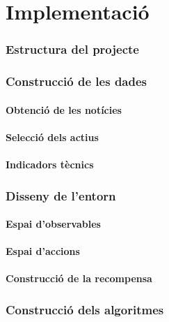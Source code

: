 \documentclass[12pt,a4paper,twoside]{book}
\begin{document}
\chapter{Implementació}
\subsection{Estructura del projecte}



\subsection{Construcció de les dades}

\subsubsection{Obtenció de les notícies}

\subsubsection{Selecció dels actius}

\subsubsection{Indicadors tècnics}


\subsection{Disseny de l'entorn}


\subsubsection{Espai d'observables}


\subsubsection{Espai d'accions}


\subsubsection{Construcció de la recompensa}



\subsection{Construcció dels algoritmes}
\end{document}
